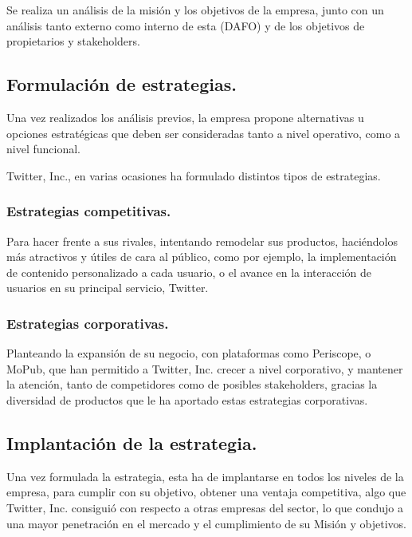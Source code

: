 Se realiza un análisis de la misión y los objetivos de la empresa, junto con un análisis tanto externo como interno de esta (DAFO) y de los objetivos de propietarios y stakeholders.

\subsection{Formulación de estrategias.}

Una vez realizados los análisis previos, la empresa propone alternativas u opciones estratégicas  que deben ser consideradas tanto a nivel operativo, como a nivel funcional.

Twitter, Inc., en varias ocasiones ha formulado distintos tipos de estrategias.

\subsubsection{Estrategias competitivas.}

Para hacer frente a sus rivales, intentando remodelar sus productos, haciéndolos más atractivos y útiles de cara al público, como por ejemplo, la implementación de contenido personalizado a cada usuario, o el avance en la interacción de usuarios en su principal servicio, Twitter.

\subsubsection{Estrategias corporativas.}

Planteando la expansión de su negocio, con plataformas como Periscope, o MoPub, que han permitido a Twitter, Inc. crecer a nivel corporativo, y mantener la atención, tanto de competidores como de posibles stakeholders, gracias la diversidad de productos que le ha aportado estas estrategias corporativas.

\subsection{Implantación de la estrategia.}

Una vez formulada la estrategia, esta ha de implantarse en todos los niveles de la empresa, para cumplir con su objetivo, obtener una ventaja competitiva, algo que Twitter, Inc. consiguió con respecto a otras empresas del sector, lo que condujo a una mayor penetración en el mercado y el cumplimiento de su Misión y objetivos.









